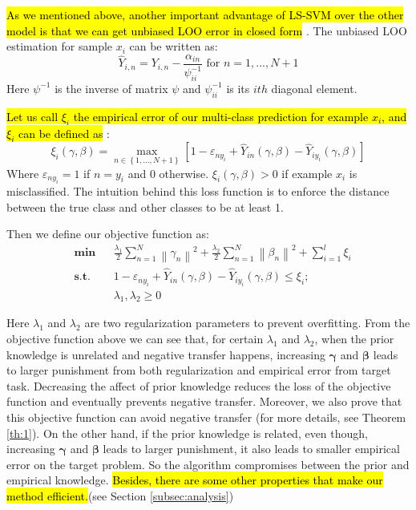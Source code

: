 \hl{As we mentioned above, another important advantage of LS-SVM over the other model is that we can get unbiased LOO error in closed form} \cite{cawley2006leave}. The unbiased LOO estimation for sample $x_i$ can be written as:
\begin{equation}
{\hat Y_{i,n}} = {Y_{i,n}} - \frac{{{\alpha _{in}}}}{{\psi_{ii}^{ - 1}}}{\text{    for   }}n = 1,...,N + 1
\end{equation}
Here $\psi^{-1}$ is the inverse of matrix $\psi$ and  $\psi_{ii}^{-1}$ is its $ith$ diagonal element. 

\hl{Let us call $\xi_i$ the empirical error of our multi-class prediction for example $x_i$, and $\xi_i$ can be defined as} \cite{crammer2002algorithmic}:
\begin{equation}\label{eq:train_loss}
\xi_i(\gamma,\beta) = \mathop {\max }\limits_{n \in \left\lbrace 1,...,N+1 \right\rbrace } {\left[ {1 - {\varepsilon _{n{y_i}}} + {{\hat Y}_{in}}\left( {\gamma ,\beta } \right) - {{\hat Y}_{i{y_i}}}\left( {\gamma ,\beta } \right)} \right]}
\end{equation}
Where $\varepsilon _{n{y_i}}=1$ if $n=y_i$ and 0 otherwise. $\xi_i(\gamma,\beta)>0$ if example $x_i$ is misclassified. The intuition behind this loss function is to enforce the distance between the true class and other classes to be at least 1.

Then we define our objective function as:
\begin{equation}\label{loss}
\begin{aligned}
& \textbf{min}
& & \frac{{{\lambda _1}}}{2}\sum\limits_{n = 1}^N {{{\left\| {{\gamma _n}} \right\|}^2}}  + \frac{{{\lambda _2}}}{2}\sum\limits_{n = 1}^N {{{\left\| {{\beta _n}} \right\|}^2}}  + \sum\limits_{i = 1}^l {{\xi _i}}   \\
& \textbf{s.t.}
& & 1 - {\varepsilon _{n{y_i}}} + {\hat Y_{in}}\left( {\gamma ,\beta } \right) - {\hat Y_{i{y_i}}}\left( {\gamma ,\beta } \right) \le {\xi_i};\\
& & &\lambda_1,\lambda_2 \ge 0
\end{aligned}
\end{equation}

Here $\lambda_1$ and $\lambda_2$ are two regularization parameters to prevent overfitting. 
From the objective function above we can see that, for certain $\lambda_1$ and $\lambda_2$, when the prior knowledge is unrelated and negative transfer happens, increasing $\boldsymbol{\gamma}$ and $\boldsymbol{\beta}$ leads to larger punishment from both regularization and empirical error from target task. Decreasing the affect of prior knowledge reduces the loss of the objective function and eventually prevents negative transfer. Moreover, we also prove that this objective function can avoid negative transfer (for more details, see Theorem \ref{th:1}). On the other hand, if the prior knowledge is related, even though, increasing $\boldsymbol{\gamma}$ and $\boldsymbol{\beta}$ leads to larger punishment, it also leads to smaller empirical error on the target problem. So the algorithm compromises between the prior and empirical knowledge. \hl{Besides, there are some other properties that make our method efficient.}(see Section \ref{subsec:analysis})


